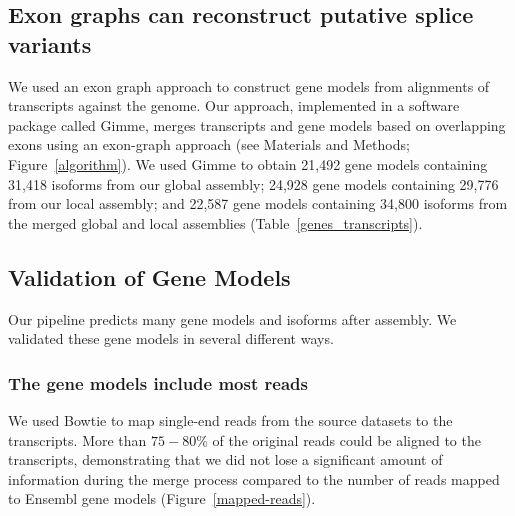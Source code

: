 \documentclass[10pt]{article}
\begin{document}




\subsection*{Exon graphs can reconstruct putative splice variants}

We used an exon graph approach to construct gene models from
alignments of transcripts against the genome.  Our approach,
implemented in a software package called Gimme, merges transcripts and
gene models based on overlapping exons using an exon-graph approach
(see Materials and Methods; Figure~\ref{algorithm}).  We used Gimme to obtain
21,492 gene models containing 31,418 isoforms from our global
assembly; 24,928 gene models containing 29,776 from our local
assembly; and 22,587 gene models containing 34,800 isoforms from the
merged global and local assemblies (Table~\ref{genes_transcripts}).

\subsection*{Validation of Gene Models}

Our pipeline predicts many gene models and isoforms after assembly.  We
validated these gene models in several different ways.


\subsubsection*{The gene models include most reads}

We used Bowtie to map single-end reads from the source datasets to the
transcripts.  More than $75-80$\% of the original reads could be aligned to the
transcripts, demonstrating that we did not lose a significant amount of
information during the merge process compared to the number of reads mapped to
Ensembl gene models (Figure~\ref{mapped-reads}).
\end{document}
